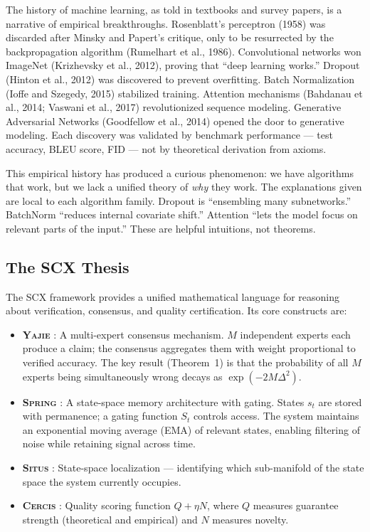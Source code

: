 \documentclass[12pt,a4paper]{article}
\theoremstyle{definition}
\newcommand{\Situs}{\textsc{Situs}}
\newcommand{\Yajie}{\textsc{Yajie}}
\newcommand{\Spring}{\textsc{Spring}}
\newcommand{\Cercis}{\textsc{Cercis}}
\newcommand{\SCX}{\textsc{SCX}}
\begin{document}
The history of machine learning, as told in textbooks and survey papers, is a narrative of empirical breakthroughs. Rosenblatt's perceptron (1958) was discarded after Minsky and Papert's critique, only to be resurrected by the backpropagation algorithm (Rumelhart et al., 1986). Convolutional networks won ImageNet (Krizhevsky et al., 2012), proving that ``deep learning works.'' Dropout (Hinton et al., 2012) was discovered to prevent overfitting. Batch Normalization (Ioffe and Szegedy, 2015) stabilized training. Attention mechanisms (Bahdanau et al., 2014; Vaswani et al., 2017) revolutionized sequence modeling. Generative Adversarial Networks (Goodfellow et al., 2014) opened the door to generative modeling. Each discovery was validated by benchmark performance — test accuracy, BLEU score, FID — not by theoretical derivation from axioms.

This empirical history has produced a curious phenomenon: we have algorithms that work, but we lack a unified theory of \emph{why} they work. The explanations given are local to each algorithm family. Dropout is ``ensembling many subnetworks.'' BatchNorm ``reduces internal covariate shift.'' Attention ``lets the model focus on relevant parts of the input.'' These are helpful intuitions, not theorems.

\subsection{The SCX Thesis}

The \SCX{} framework provides a unified mathematical language for reasoning about verification, consensus, and quality certification. Its core constructs are:

\begin{itemize}[nosep]
    \item \textbf{\Yajie{} }: A multi-expert consensus mechanism. $M$ independent experts each produce a claim; the consensus aggregates them with weight proportional to verified accuracy. The key result (Theorem~1) is that the probability of all $M$ experts being simultaneously wrong decays as $\exp(-2M\Delta^2)$.
    \item \textbf{\Spring{} }: A state-space memory architecture with gating. States $s_t$ are stored with permanence; a gating function $S_t$ controls access. The system maintains an exponential moving average (EMA) of relevant states, enabling filtering of noise while retaining signal across time.
    \item \textbf{\Situs{} }: State-space localization — identifying which sub-manifold of the state space the system currently occupies.
    \item \textbf{\Cercis{} }: Quality scoring function $Q + \eta N$, where $Q$ measures guarantee strength (theoretical and empirical) and $N$ measures novelty.
\end{itemize}
\end{document}
